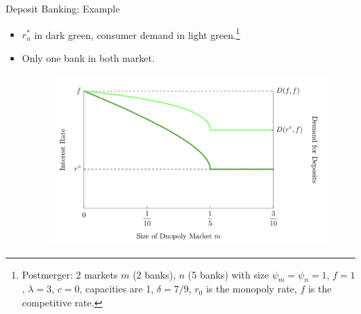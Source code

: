 \documentclass[notes,10.2pt, aspectratio=169]{beamer}
\begin{document}
      
  \begin{frame}{Deposit Banking: Example}
    \begin{itemize}
      \item $r^*_n$ in dark green, consumer demand in light green.\footnote{Postmerger: 2 markets $m$ (2 banks), $n$ (5 banks) with size $\psi_m = \psi_n = 1$,  
       $f = 1$, $\lambda = 3$, $c = 0$, capacities are 1, $\delta = 7/9$, $r_0$ is the monopoly rate, $f$ is the competitive rate.}
      \item Only one bank in both market. 
            \begin{figure}[t*]
            \centering
            \includegraphics[width=.65\textwidth]{./imgs/figure8.png}
          \end{figure}
  
    
    \end{itemize}
  \end{frame}
  
\end{document}
